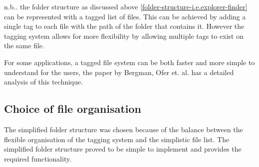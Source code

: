 n.b.. the folder structure as discussed above
\ref{folder-structure-i.e.explorer-finder} can be represented with a tagged list
of files. This can be achieved by adding a single tag to each file with the path
of the folder that contains it. However the tagging system allows for more
flexibility by allowing multiple tags to exist on the same file.

For some applications, a tagged file system can be both faster and more simple
to understand for the users, the paper by Bergman, Ofer et. al.\cite{ASI:ASI22906}
has a detailed analysis of this technique.

\subsection{Choice of file organisation}\label{choice-of-file-organization}

The simplified folder structure was chosen because of the balance
between the flexible organisation of the tagging system and the
simplistic file list. The simplified folder structure proved to be
simple to implement and provides the required functionality.


